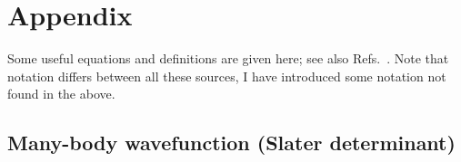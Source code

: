 \documentclass[10pt,twocolumn,a4paper]{article}%
\begin{document}
%












\appendix

\setcounter{equation}{0}
\setcounter{figure}{0}
\setcounter{table}{0}
\renewcommand{\theequation}{A.\arabic{equation}}
\renewcommand{\thefigure}{A.\arabic{figure}}
\renewcommand{\thetable}{A.\arabic{table}}

\section{Appendix}
\small

Some useful equations and definitions are given here; see also Refs.~\cite{LLVol3,JohnsonBook2007,Sobelman1992,Varshalovich1988,Lindgren1986,Sapirstein1998,DzubaHFS1984}.
Note that notation differs between all these sources, I have introduced some notation not found in the above.

\subsection{Many-body wavefunction (Slater determinant)}\label{sec:ManyBodyWavefunction}
\end{document}
